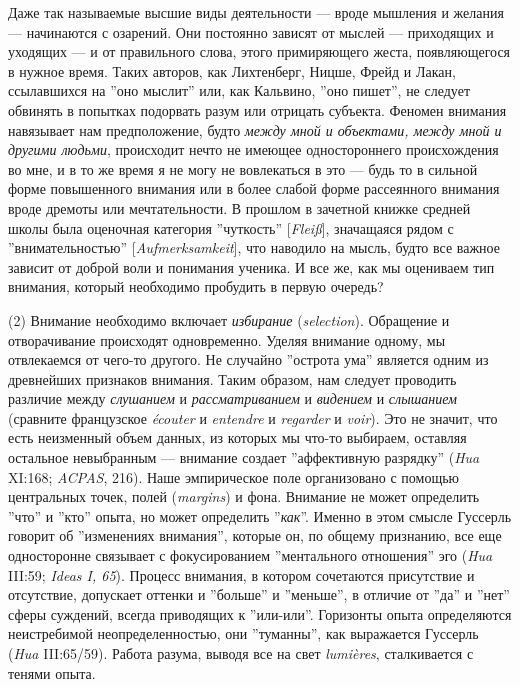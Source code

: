 \documentclass[12pt]{book}
\begin{document}
Даже так называемые высшие виды деятельности --- вроде мышления и желания --- начинаются с озарений. Они постоянно зависят от мыслей --- приходящих и уходящих --- и от правильного слова, этого примиряющего жеста, появляющегося в нужное время. Таких авторов, как Лихтенберг, Ницше, Фрейд и Лакан, ссылавшихся на ''оно мыслит'' или, как Кальвино, ''оно пишет'', не следует обвинять в попытках подорвать разум или отрицать субъекта. Феномен внимания навязывает нам предположение, будто \textit{между мной и объектами, между мной и другими людьми}, происходит нечто не имеющее одностороннего происхождения во мне, и в то же время я не могу не вовлекаться в это --- будь то в сильной форме повышенного внимания или в более слабой форме рассеянного внимания вроде дремоты или мечтательности. В прошлом в зачетной книжке средней школы была оценочная категория ''чуткость'' [\textit{Fleiß}], значащаяся рядом с ''внимательностью'' [\textit{Aufmerksamkeit}], что наводило на мысль, будто все важное зависит от доброй воли и понимания ученика. И все же, как мы оцениваем тип внимания, который необходимо пробудить в первую очередь?

(2) Внимание необходимо включает \textit{избирание} (\textit{selection}). Обращение и отворачивание происходят одновременно. Уделяя внимание одному, мы отвлекаемся от чего-то другого. Не случайно ''острота ума'' является одним из древнейших признаков внимания. Таким образом, нам следует проводить различие между \textit{слушанием} и \textit{рассматриванием} и \textit{видением} и \textit{слышанием} (сравните французское \textit{écouter} и \textit{entendre} и \textit{regarder} и \textit{voir}). Это не значит, что есть неизменный объем данных, из которых мы что-то выбираем, оставляя остальное невыбранным --- внимание создает ''аффективную разрядку'' (\textit{Hua} XI:168; \textit{ACPAS}, 216). Наше эмпирическое поле организовано с помощью центральных точек, полей (\textit{margins}) и фона. Внимание не может определить ''что'' и ''кто'' опыта, но может определить ''\textit{как}''. Именно в этом смысле Гуссерль говорит об ''изменениях внимания'', которые он, по общему признанию, все еще односторонне связывает с фокусированием ''ментального отношения'' эго (\textit{Hua} III:59; \textit{Ideas I, 65}). Процесс внимания, в котором сочетаются присутствие и отсутствие, допускает оттенки и ''больше'' и ''меньше'', в отличие от ''да'' и ''нет'' сферы суждений, всегда приводящих к ''или-или''. Горизонты опыта определяются неистребимой неопределенностью, они ''туманны'', как выражается Гуссерль (\textit{Hua} III:65/59). Работа разума, выводя все на свет \textit{lumières}, сталкивается с тенями опыта.
\end{document}
